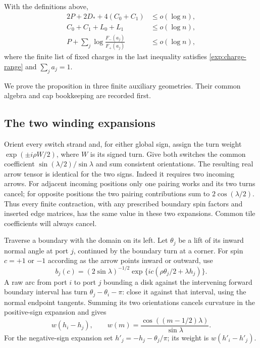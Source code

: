 \begin{proposition}\label{exp:comparisons}
With the definitions above,
\begin{align}
 2P+2D_*+4(C_0+C_1)&\le o(\log n),\label{exp:rectangle-budget}\\
 C_0+C_1+L_0+L_1&\le o(\log n),\label{exp:corner-budget}\\
 P+\sum_j\log\frac{F_-(a_j)}{F_+(a_j)}
   &\le o(\log n),\label{exp:charge-budget}
\end{align}
where the finite list of fixed charges in the last inequality satisfies
\eqref{exp:charge-range} and $\sum_j a_j=1$.
\end{proposition}

We prove the proposition in three finite auxiliary geometries. Their
common algebra and cap bookkeeping are recorded first.

\subsection{The two winding expansions}

Orient every switch strand and, for either global sign, assign the turn
weight $\exp(\pm i\rho W/2)$, where $W$ is its signed turn. Give both
switches the common coefficient $\sin(\lambda/2)/\sin\lambda$ and sum
consistent orientations. The resulting real arrow tensor is identical
for the two signs. Indeed it requires two incoming arrows. For adjacent
incoming positions only one pairing works and its two turns cancel;
for opposite positions the two pairing contributions sum to
$2\cos(\lambda/2)$. Thus every finite contraction, with any prescribed
boundary spin factors and inserted edge matrices, has the same value
in these two expansions. Common tile coefficients will always cancel.

Traverse a boundary with the domain on its left. Let $\theta_j$ be a
lift of its inward normal angle at port $j$, continued by the boundary
turn at a corner. For spin $c=+1$ or $-1$ according as the arrow points
inward or outward, use
\begin{equation}\label{exp:boundary-spin}
 b_j(c)=(2\sin\lambda)^{-1/2}
          \exp\{ic(\rho\theta_j/2+\lambda h_j)\}.
\end{equation}
A raw arc from port $i$ to port $j$ bounding a disk against the
intervening forward boundary interval has turn
$\theta_j-\theta_i-\pi$: close it against that interval, using the
normal endpoint tangents. Summing its two orientations cancels curvature
in the positive-sign expansion and gives
\begin{equation}\label{exp:arc-weight}
 w(h_i-h_j),\qquad
 w(m)=\frac{\cos((m-1/2)\lambda)}{\sin\lambda}.
\end{equation}
For the negative-sign expansion set $h'_j=-h_j-\theta_j/\pi$;
its weight is $w(h'_i-h'_j)$.

